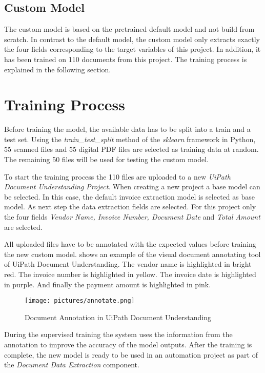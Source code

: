 \subsection*{Custom Model}
The custom model is based on the pretrained default model and not build from scratch. In contrast to the default model, the custom model only extracts exactly the four fields corresponding to the target variables of this project. In addition, it has been trained on 110 documents from this project. The training process is explained in the following section.
\section{Training Process}

Before training the model, the available data has to be split into a train and a test set. Using the \textit{train\_test\_split} method of the \textit{sklearn} framework in Python, 55 scanned files and 55 digital PDF files are selected as training data at random. The remaining 50 files will be used for testing the custom model.

To start the training process the 110 files are uploaded to a new \textit{UiPath Document Understanding Project}. When creating a new project a base model can be selected. In this case, the default invoice extraction model is selected as base model. As next step the data extraction fields are selected. For this project only the four fields \textit{Vendor Name, Invoice Number, Document Date} and \textit{Total Amount} are selected.

All uploaded files have to be annotated with the expected values before training the new custom model.
 shows an example of the visual document annotating tool of UiPath Document Understanding. The vendor name is highlighted in bright red. The invoice number is highlighted in yellow. The invoice date is highlighted in purple. And finally the payment amount is highlighted in pink.

\begin{figure}
    \centering
    \texttt{[image: pictures/annotate.png]}
    \caption{Document Annotation in UiPath Document Understanding}
    \label{fig:annotate}
\end{figure}

During the supervised training the system uses the information from the annotation to improve the accuracy of the model outputs. After the training is complete, the new model is ready to be used in an automation project as part of the \textit{Document Data Extraction} component. 

